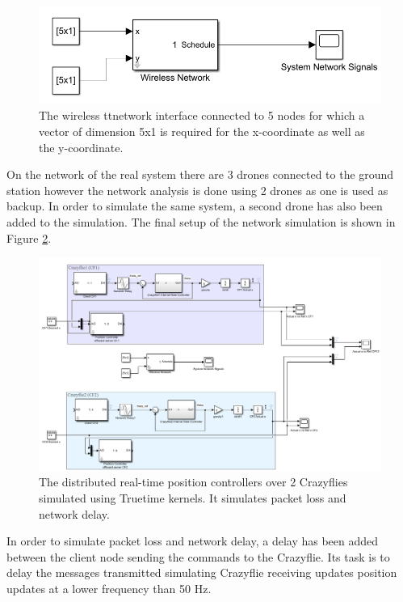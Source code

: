 \begin{figure}[H]
\centering
 \includegraphics[scale=0.6]{Figures/wireless_network.png}
 \caption{The wireless ttnetwork interface connected to 5 nodes for which a vector of dimension 5x1 is required for the x-coordinate as well as the y-coordinate.}
 \label{wireless_network}
\end{figure}

On the network of the real system there are 3 drones connected to the ground station however the network analysis is done using 2 drones as one is used as backup. In order to simulate the same system, a second drone has also been added to the simulation. The final setup of the network simulation is shown in Figure \ref{position_contr_simulink}.


\begin{figure}[H]
\centering
 \includegraphics[scale=0.6]{Figures/network_simulation.png}
 \caption{The distributed real-time position controllers over 2 Crazyflies simulated using Truetime kernels. It simulates packet loss and network delay.}
 \label{position_contr_simulink}
\end{figure}

In order to simulate packet loss and network delay, a delay has been added between the client node sending the commands to the Crazyflie. Its task is to delay the messages transmitted simulating Crazyflie receiving updates position updates at a lower frequency than 50 Hz.\\  

